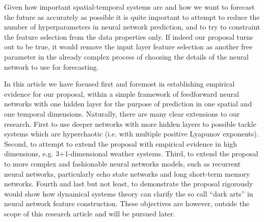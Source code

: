 \documentclass[journal]{IEEEtran}
\begin{document}
Given how important spatial-temporal systems are 
and how we want to forecast the future as accurately as possible 
it is quite 
important to attempt to reduce the number of hyperparameters in neural network prediction, and to try to constraint the feature selection from 
the data properties only. If indeed our proposal turns out to be true, it would remove the input layer feature selection as another free 
parameter in the already complex process of choosing the details of the neural network to use for forecasting.

In this article we have focused first and foremost in establishing empirical evidence for our proposal, within a simple framework of 
feedforward neural networks with one hidden layer for the purpose of prediction in one spatial and one temporal dimensions. Naturally, 
there are many clear extensions to our research. First to use deeper networks with more hidden 
layers to possible tackle systems which are hyperchaotic (i.e. with multiple positive Lyapunov exponents). Second, to attempt to extend the proposal with empirical evidence in high 
dimensions, e.g. 3+1-dimensional weather systems. Third, to extend the proposal to more complex and fashionable
neural networks models, such as recurrent neural networks, particularly echo state networks and long short-term memory networks.
 Fourth and last but not least, to demonstrate the proposal rigorously would show how dynamical systems theory can clarify the so call
 ``dark arts'' in neural network feature construction. These objectives are however, outside the scope
 of this research article and will be pursued later.


%
\end{document}
